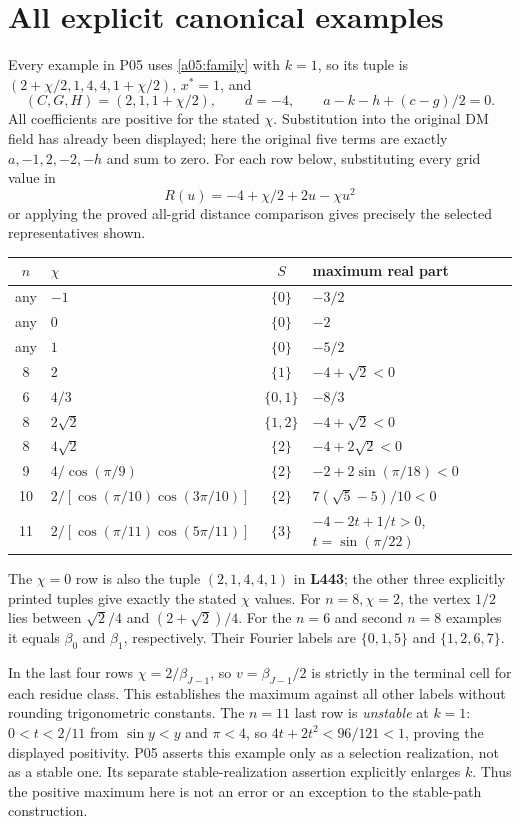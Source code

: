 \documentclass[11pt]{article}
\newcommand{\lin}[1]{\textbf{L#1}}
\begin{document}
\section{All explicit canonical examples}
Every example in P05 uses \eqref{a05:family} with $k=1$, so its tuple
is $(2+\chi/2,1,4,4,1+\chi/2)$, $x^*=1$, and
\[
 (C,G,H)=(2,1,1+\chi/2),\qquad d=-4,
 \qquad a-k-h+(c-g)/2=0.
\]
All coefficients are positive for the stated $\chi$. Substitution into
the original DM field has already been displayed; here the original
five terms are exactly $a,-1,2,-2,-h$ and sum to zero. For each row
below, substituting every grid value in
\[
 R(u)=-4+\chi/2+2u-\chi u^2
\]
or applying the proved all-grid distance comparison gives precisely
the selected representatives shown.
\begin{center}\small
\begin{tabular}{@{}c l c l@{}}
\toprule
$n$&$\chi$&$S$&maximum real part\\\midrule
any&$-1$&$\{0\}$&$-3/2$\\
any&$0$&$\{0\}$&$-2$\\
any&$1$&$\{0\}$&$-5/2$\\
8&$2$&$\{1\}$&$-4+\sqrt2<0$\\
6&$4/3$&$\{0,1\}$&$-8/3$\\
8&$2\sqrt2$&$\{1,2\}$&$-4+\sqrt2<0$\\
8&$4\sqrt2$&$\{2\}$&$-4+2\sqrt2<0$\\
9&$4/\cos(\pi/9)$&$\{2\}$&$-2+2\sin(\pi/18)<0$\\
10&$2/[\cos(\pi/10)\cos(3\pi/10)]$&$\{2\}$&$7(\sqrt5-5)/10<0$\\
11&$2/[\cos(\pi/11)\cos(5\pi/11)]$&$\{3\}$&$-4-2t+1/t>0$, $t=\sin(\pi/22)$\\\bottomrule
\end{tabular}\end{center}
The $\chi=0$ row is also the tuple $(2,1,4,4,1)$ in \lin{443};
the other three explicitly printed tuples give exactly the stated
$\chi$ values. For $n=8,\chi=2$, the vertex $1/2$ lies between
$\sqrt2/4$ and $(2+\sqrt2)/4$. For the $n=6$ and second $n=8$
examples it equals $\beta_0$ and $\beta_1$, respectively. Their
Fourier labels are $\{0,1,5\}$ and $\{1,2,6,7\}$.

In the last four rows $\chi=2/\beta_{J-1}$, so
$v=\beta_{J-1}/2$ is strictly in the terminal cell for each residue
class. This establishes the maximum against all other labels without
rounding trigonometric constants. The $n=11$ last row is \emph{unstable}
at $k=1$: $0<t<2/11$ from $\sin y<y$ and $\pi<4$, so
$4t+2t^2<96/121<1$, proving the displayed positivity.
P05 asserts this example only as a selection realization, not as a
stable one. Its separate stable-realization assertion explicitly enlarges
$k$. Thus the positive maximum here is not an error or an exception
to the stable-path construction.
\end{document}
